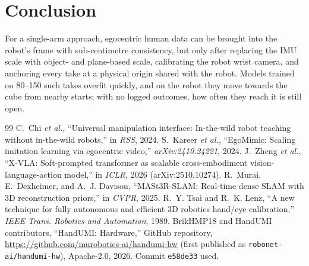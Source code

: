 \documentclass[conference,10pt]{IEEEtran}
\begin{document}
\section{Conclusion}
For a single-arm approach, egocentric human data can be brought into the robot's frame with sub-centimetre consistency, but
only after replacing the IMU scale with object- and plane-based scale, calibrating the robot wrist camera, and anchoring every
take at a physical origin shared with the robot. Models trained on 80--150 such takes overfit quickly, and on the robot they move
towards the cube from nearby starts; with no logged outcomes, how often they reach it is still open.

\begin{thebibliography}{99}\footnotesize
{} C.~Chi \emph{et al.}, ``Universal manipulation interface: In-the-wild robot teaching without in-the-wild robots,'' in \emph{RSS}, 2024.
 S.~Kareer \emph{et al.}, ``EgoMimic: Scaling imitation learning via egocentric video,'' \emph{arXiv:2410.24221}, 2024.
 J.~Zheng \emph{et al.}, ``X-VLA: Soft-prompted transformer as scalable cross-embodiment vision-language-action model,'' in \emph{ICLR}, 2026 (arXiv:2510.10274).
 R.~Murai, E.~Dexheimer, and A.~J. Davison, ``MASt3R-SLAM: Real-time dense SLAM with 3D reconstruction priors,'' in \emph{CVPR}, 2025.
 R.~Y. Tsai and R.~K. Lenz, ``A new technique for fully autonomous and efficient 3D robotics hand/eye calibration,'' \emph{IEEE Trans. Robotics and Automation}, 1989.
 BrikHMP18 and HandUMI contributors, ``HandUMI: Hardware,'' GitHub repository, \url{https://github.com/murobotics-ai/handumi-hw} (first published as \texttt{robonet-ai/handumi-hw}), Apache-2.0, 2026. Commit \texttt{e58de33} used.
\end{thebibliography}
\end{document}
